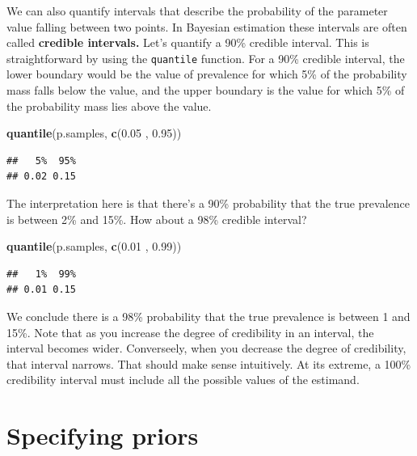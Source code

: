 \documentclass[
]{book}
\newenvironment{Shaded}{\begin{snugshade}}{\end{snugshade}}
\newcommand{\FloatTok}[1]{\textcolor[rgb]{0.00,0.00,0.81}{#1}}
\newcommand{\FunctionTok}[1]{\textcolor[rgb]{0.13,0.29,0.53}{\textbf{#1}}}
\newcommand{\NormalTok}[1]{#1}
\begin{document}
We can also quantify intervals that describe the probability of the
parameter value falling between two points. In Bayesian estimation these
intervals are often called \textbf{credible intervals.} Let's quantify a 90\%
credible interval. This is straightforward by using the \texttt{quantile}
function. For a 90\% credible interval, the lower boundary would be the
value of prevalence for which 5\% of the probability mass falls below the
value, and the upper boundary is the value for which 5\% of the
probability mass lies above the value.

\begin{Shaded}
\begin{Highlighting}[]
\FunctionTok{quantile}\NormalTok{(p.samples, }\FunctionTok{c}\NormalTok{(}\FloatTok{0.05}\NormalTok{ , }\FloatTok{0.95}\NormalTok{))}
\end{Highlighting}
\end{Shaded}

\begin{verbatim}
##   5%  95% 
## 0.02 0.15
\end{verbatim}

The interpretation here is that there's a 90\% probability that the true
prevalence is between 2\% and 15\%. How about a 98\% credible interval?

\begin{Shaded}
\begin{Highlighting}[]
\FunctionTok{quantile}\NormalTok{(p.samples, }\FunctionTok{c}\NormalTok{(}\FloatTok{0.01}\NormalTok{ , }\FloatTok{0.99}\NormalTok{))}
\end{Highlighting}
\end{Shaded}

\begin{verbatim}
##   1%  99% 
## 0.01 0.15
\end{verbatim}

We conclude there is a 98\% probability that the true prevalence is
between 1 and 15\%. Note that as you increase the degree of credibility
in an interval, the interval becomes wider. Converseely, when you
decrease the degree of credibility, that interval narrows. That should
make sense intuitively. At its extreme, a 100\% credibility interval must
include all the possible values of the estimand.

\section{Specifying priors}\label{specifying-priors}
\end{document}
